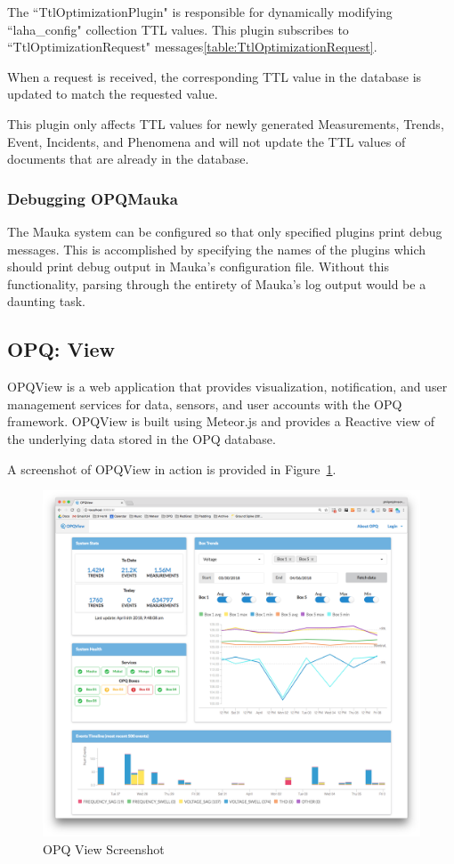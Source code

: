 The ``TtlOptimizationPlugin" is responsible for dynamically modifying ``laha\_config" collection TTL values. This plugin subscribes to ``TtlOptimizationRequest" messages\ref{table:TtlOptimizationRequest}.

When a request is received, the corresponding TTL value in the database is updated to match the requested value.

This plugin only affects TTL values for newly generated Measurements, Trends, Event, Incidents, and Phenomena and will not update the TTL values of documents that are already in the database.

\subsubsection{Debugging OPQMauka}
The Mauka system can be configured so that only specified plugins print debug messages. This is accomplished by specifying the names of the plugins which should print debug output in Mauka's configuration file. Without this functionality, parsing through the entirety of Mauka's log output would be a daunting task.

\subsection{OPQ: View}\label{subsec:opq:-view}
OPQView is a web application that provides visualization, notification, and user management services for data, sensors, and user accounts with the OPQ framework. OPQView is built using Meteor.js and provides a Reactive view of the underlying data stored in the OPQ database.

A screenshot of OPQView in action is provided in Figure~\ref{fig:opq-view}.

\begin{figure}
	\centering
	\includegraphics[width=1\linewidth]{figures/opqview-landing-page.png}
	\caption{OPQ View Screenshot}\label{fig:opq-view}
\end{figure}


